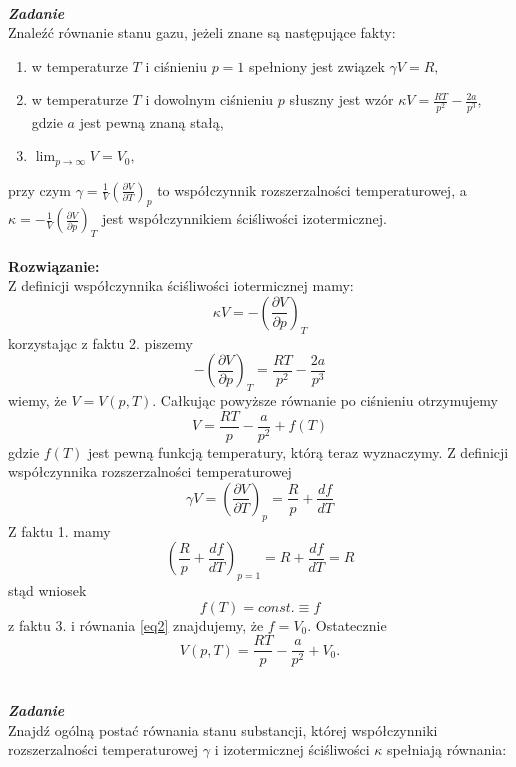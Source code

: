 \documentclass[11pt,a4paper]{article}
\newcounter{zadanie}\newcommand{\zadanie}[1][]{\addtocounter{zadanie}{1} ~\\  {\bf \emph{Zadanie \arabic{zadanie} #1 }} \\}
\newcommand{\Partial}[3]{\left( \frac{\partial #1}{\partial #2} \right)_{#3}}
\begin{document}
\zadanie
Znaleźć równanie stanu gazu, jeżeli znane są następujące fakty:
\begin{enumerate}
\item w temperaturze $T$ i ciśnieniu $p=1$ spełniony jest związek
$\gamma V = R,$
\item w temperaturze $T$ i dowolnym ciśnieniu $p$ słuszny jest wzór $\kappa V = \frac{RT}{p^2}-\frac{2a}{p^3},$
gdzie $a$ jest pewną znaną stałą,
\item $\lim_{p\rightarrow\infty}V=V_0,$
\end{enumerate}
przy czym $\gamma=\frac{1}{V}\left(\frac{\partial V}{\partial T}\right)_p$ to współczynnik rozszerzalności temperaturowej, a
\mbox{$\kappa=-\frac{1}{V}\left(\frac{\partial V}{\partial p}\right)_T$} jest współczynnikiem ściśliwości izotermicznej.\\
\\
\textbf{Rozwiązanie:}
\\
Z definicji współczynnika ściśliwości iotermicznej mamy:
\begin{equation}
    \kappa V = -\Partial{V}{p}{T}
\end{equation}
korzystając z faktu 2. piszemy
\begin{equation*}
    -\Partial{V}{p}{T}=\frac{RT}{p^2}-\frac{2a}{p^3}
\end{equation*}
wiemy, że $V=V(p,T)$. Całkując powyższe równanie po ciśnieniu otrzymujemy
\begin{equation}
\label{eq2}
    V = \frac{RT}{p}-\frac{a}{p^2}+f(T)
\end{equation}
gdzie $f(T)$ jest pewną funkcją temperatury, którą teraz wyznaczymy. Z definicji współczynnika rozszerzalności temperaturowej
\begin{equation*}
    \gamma V = \Partial{V}{T}{p}=\frac{R}{p}+\frac{ df}{dT}
\end{equation*}
Z faktu 1. mamy
\begin{equation*}
    \left(\frac{R}{p}+\frac{ df}{dT}\right )_{p=1}=R+\frac{ df}{dT}=R
\end{equation*}
stąd wniosek
\begin{equation*}
    f(T)=const. \equiv f
\end{equation*}
z faktu 3. i równania \eqref{eq2} znajdujemy, że $f=V_0$. Ostatecznie
\begin{equation*}
    V(p,T)=\frac{RT}{p}-\frac{a}{p^2}+V_0.
\end{equation*}
\newpage
\zadanie
Znajdź ogólną postać równania stanu substancji, której współczynniki rozszerzalności temperaturowej  $\gamma$ i izotermicznej ściśliwości $\kappa$ spełniają równania:
\end{document}
